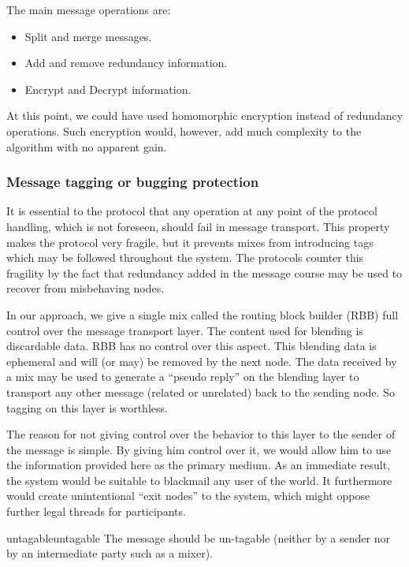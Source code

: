 The main message operations are:
\begin{itemize}
	\item Split and merge messages.
	\item Add and remove redundancy information.
	\item Encrypt and Decrypt information.
\end{itemize}

At this point, we could have used homomorphic encryption instead of redundancy operations. Such encryption would, however, add much complexity to the algorithm with no apparent gain.

\subsubsection{Message tagging or bugging protection}
It is essential to the protocol that any operation at any point of the protocol handling, which is not foreseen, should fail in message transport. This property makes the protocol very fragile, but it prevents mixes from introducing tags which may be followed throughout the system. The protocols counter this fragility by the fact that redundancy added in the message course may be used to recover from misbehaving nodes.

In our approach, we give a single mix called the routing block builder (RBB) full control over the message transport layer. The content used for blending is discardable data. RBB has no control over this aspect. This blending data is ephemeral and will (or may) be removed by the next node. The data received by a mix may be used to generate a ``pseudo reply'' on the blending layer to transport any other message (related or unrelated) back to the sending node. So tagging on this layer is worthless.

The reason for not giving control over the behavior to this layer to the sender of the message is simple. By giving him control over it, we would allow him to use the information provided here as the primary medium. As an immediate result, the system would be suitable to blackmail any user of the world. It furthermore would create unintentional ``exit nodes'' to the system, which might oppose further legal threads for participants.

\begin{requirement}{untagable}{untagable}
	The message should be un-tagable (neither by a sender nor by an intermediate party such as a mixer).
\end{requirement}

